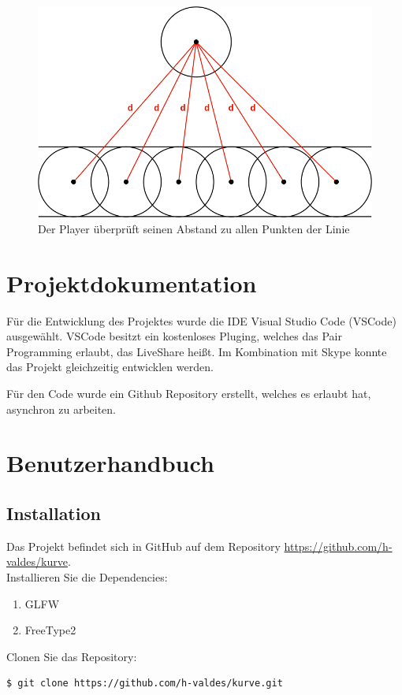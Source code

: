 \documentclass[doktyp=studarbeit]{TUBAFarbeiten}
\begin{document}
\begin{figure}[!htb]
    \centering
    \includegraphics[width=0.6\linewidth]{collisions-2.png}
    \caption{Der Player überprüft seinen Abstand zu allen Punkten der Linie}
    \label{fig:collisions-2}
\end{figure}

\section{Projektdokumentation}

Für die Entwicklung des Projektes wurde die IDE Visual Studio Code (VSCode) 
ausgewählt. VSCode besitzt ein kostenloses Pluging, welches das Pair Programming
erlaubt, das LiveShare heißt. Im Kombination mit Skype konnte das Projekt
gleichzeitig entwicklen werden.

Für den Code wurde ein Github Repository erstellt, welches es erlaubt hat,
asynchron zu arbeiten.

\section{Benutzerhandbuch}

\subsection{Installation}
Das Projekt befindet sich in GitHub auf dem Repository 
\url{https://github.com/h-valdes/kurve}. \\

Installieren Sie die Dependencies:
\begin{enumerate}
    \item GLFW
    \item FreeType2
\end{enumerate}

Clonen Sie das Repository:
\begin{lstlisting}[language=bash]
$ git clone https://github.com/h-valdes/kurve.git
\end{lstlisting}
\end{document}
